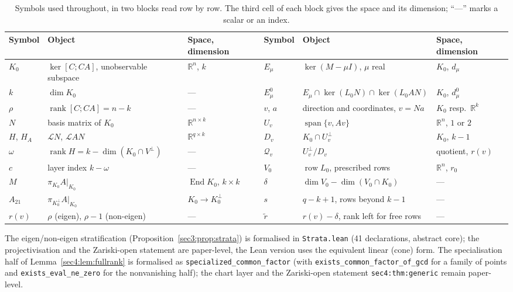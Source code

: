 \documentclass[journal]{IEEEtran}
\theoremstyle{plainn}
\theoremstyle{remark}
\newcommand{\row}{\operatorname{row}}
\newcommand{\rank}{\operatorname{rank}}
\begin{document}
\begin{table}[t]
\centering
\caption{Symbols used throughout, in two blocks read row by row. The third cell of each block gives
the space and its dimension; ``---'' marks a scalar or an index.}
\label{tab:notation}
\small
\begin{tabular}{@{}llllll@{}}
\toprule
Symbol & Object & Space, dimension & Symbol & Object & Space, dimension \\
\midrule
$K_0$ & $\ker[C;CA]$, unobservable subspace & $\mathbb R^n$, $k$ &
$E_\mu$ & $\ker(M-\mu I)$, $\mu$ real & $K_0$, $d_\mu$ \\
$k$ & $\dim K_0$ & --- &
$E_\mu^0$ & $E_\mu\cap\ker(L_0N)\cap\ker(L_0AN)$ & $K_0$, $d_\mu^0$ \\
$\rho$ & $\rank[C;CA]=n-k$ & --- &
$v$, $a$ & direction and coordinates, $v=Na$ & $K_0$ resp.\ $\mathbb R^k$ \\
$N$ & basis matrix of $K_0$ & $\mathbb R^{n\times k}$ &
$U_v$ & $\operatorname{span}\{v,Av\}$ & $\mathbb R^n$, $1$ or $2$ \\
$H$, $H_A$ & $\mathcal LN$, $\mathcal LAN$ & $\mathbb R^{q\times k}$ &
$D_v$ & $K_0\cap U_v^\perp$ & $K_0$, $k-1$ \\
$\omega$ & $\rank H=k-\dim(K_0\cap V^{\perp})$ & --- &
$\mathcal Q_v$ & $U_v^\perp/D_v$ & quotient, $r(v)$ \\
$c$ & layer index $k-\omega$ & --- &
$V_0$ & $\row L_0$, prescribed rows & $\mathbb R^n$, $r_0$ \\
$M$ & $\pi_{K_0}A|_{K_0}$ & $\operatorname{End}K_0$, $k\times k$ &
$\delta$ & $\dim V_0-\dim(V_0\cap K_0)$ & --- \\
$A_{21}$ & $\pi_{K_0^\perp}A|_{K_0}$ & $K_0\to K_0^\perp$ &
$s$ & $q-k+1$, rows beyond $k-1$ & --- \\
$r(v)$ & $\rho$ (eigen), $\rho-1$ (non-eigen) & --- &
$\widetilde r$ & $r(v)-\delta$, rank left for free rows & --- \\
\bottomrule
\end{tabular}
\end{table}

The eigen/non-eigen stratification (Proposition~\ref{sec3:prop:strata}) is formalised in \texttt{Strata.lean} (41 declarations, abstract core); the projectivisation and the Zariski-open statement are paper-level, the Lean version uses the equivalent linear (cone) form.
The specialisation half of Lemma~\ref{sec4:lem:fullrank} is formalised as \texttt{specialized\_common\_factor} (with \texttt{exists\_common\_factor\_of\_gcd} for a family of points and \texttt{exists\_eval\_ne\_zero} for the nonvanishing half); the chart layer and the Zariski-open statement \texttt{sec4:thm:generic} remain paper-level.
\end{document}
